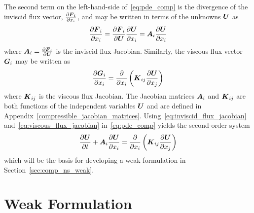 The second term on the left-hand-side of~\eqref{eq:pde_comp} is the divergence of the inviscid flux vector, ${\frac{\partial{{\boldsymbol{F}}_i}}{\partial{x_i}}}$, and may be written in terms of the unknowns ${\boldsymbol{U}}$ as
\begin{equation}
  \label{eq:inviscid_flux_jacobian}
  {\frac{\partial{{\boldsymbol{F}}_i}}{\partial{x_i}}} =
    {\frac{\partial{{\boldsymbol{F}}_i}}{\partial{{\boldsymbol{U}}}}} {\frac{\partial{{\boldsymbol{U}}}}{\partial{x_i}}} =
      {\boldsymbol{A}}_i {\frac{\partial{{\boldsymbol{U}}}}{\partial{x_i}}}
\end{equation}
where ${\boldsymbol{A}}_i = {\frac{\partial{{\boldsymbol{F}}_i}}{\partial{{\boldsymbol{U}}}}}$ is the inviscid flux Jacobian. Similarly, the viscous flux vector ${\boldsymbol{G}}_i$ may be written as
\begin{equation}
  \label{eq:viscous_flux_jacobian}
  {\frac{\partial{{\boldsymbol{G}}_i}}{\partial{x_i}}} = {\frac{\partial{}}{\partial{x_i}}} \left( {\boldsymbol{K}}_{ij} {\frac{\partial{{\boldsymbol{U}}}}{\partial{x_j}}} \right)
\end{equation}
where ${\boldsymbol{K}}_{ij}$ is the viscous flux Jacobian. The Jacobian matrices ${\boldsymbol{A}}_i$ and ${\boldsymbol{K}}_{ij}$ are both functions of the independent variables ${\boldsymbol{U}}$ and are defined in Appendix~\ref{compressible_jacobian_matrices}. Using~\eqref{eq:inviscid_flux_jacobian} and~\eqref{eq:viscous_flux_jacobian} in~\eqref{eq:pde_comp} yields the second-order system
\begin{equation}
  \label{eq:pde_comp2}
  {\frac{\partial{{\boldsymbol{U}}}}{\partial{t}}} + {\boldsymbol{A}}_i {\frac{\partial{{\boldsymbol{U}}}}{\partial{x_i}}} =
    {\frac{\partial{}}{\partial{x_i}}} \left( {\boldsymbol{K}}_{ij} {\frac{\partial{{\boldsymbol{U}}}}{\partial{x_j}}} \right)
\end{equation}
which will be the basis for developing a weak formulation in Section~\ref{sec:comp_ns_weak}.



\section{Weak Formulation\label{sec:comp_ns_weak}}
